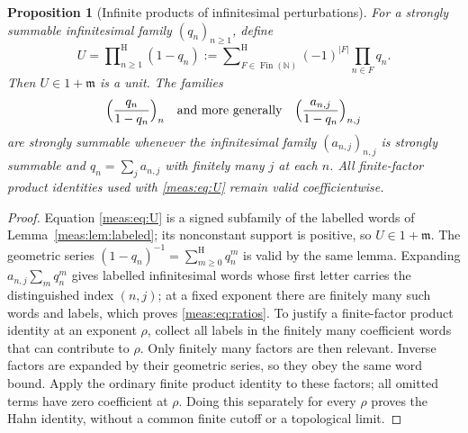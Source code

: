 \documentclass[11pt]{article}
\numberwithin{equation}{section}
\newtheorem{proposition}[theorem]{Proposition}
\theoremstyle{definition}
\theoremstyle{remark}
\newcommand{\N}{\mathbb N}
\newcommand{\Fin}{\operatorname{Fin}}
\newcommand{\hsum}{\mathop{\sum}\nolimits^{\mathrm H}}
\newcommand{\hprod}{\mathop{\prod}\nolimits^{\mathrm H}}
\newcommand{\abs}[1]{\lvert#1\rvert}
\begin{document}
\begin{proposition}[Infinite products of infinitesimal perturbations]
\label{meas:prop:products}
For a strongly summable infinitesimal family $(q_n)_{n\ge1}$, define
\begin{equation}\label{meas:eq:U}
 U=\hprod_{n\ge1}(1-q_n)
   :=\hsum_{F\in\Fin(\N)}(-1)^{\abs F}\prod_{n\in F}q_n .
\end{equation}
Then $U\in1+\mathfrak m$ is a unit. The families
\begin{equation}\label{meas:eq:ratios}
 \Bigl(\frac{q_n}{1-q_n}\Bigr)_n\quad\text{and more generally}\quad
 \Bigl(\frac{a_{n,j}}{1-q_n}\Bigr)_{n,j}
\end{equation}
are strongly summable whenever the infinitesimal family $(a_{n,j})_{n,j}$ is
strongly summable and $q_n=\sum_ja_{n,j}$ with finitely many $j$ at each $n$.
All finite-factor product identities used with \eqref{meas:eq:U} remain valid
coefficientwise.
\end{proposition}
\begin{proof}
Equation \eqref{meas:eq:U} is a signed subfamily of the labelled words of
Lemma~\ref{meas:lem:labeled}; its nonconstant support is positive, so
$U\in1+\mathfrak m$. The geometric series $(1-q_n)^{-1}=\hsum_{m\ge0}q_n^m$ is
valid by the same lemma. Expanding $a_{n,j}\sum_mq_n^m$ gives labelled
infinitesimal words whose first letter carries the distinguished index
$(n,j)$; at a fixed exponent there are finitely many such words and labels,
which proves \eqref{meas:eq:ratios}. To justify a finite-factor product
identity at an exponent $\rho$, collect
all labels in the finitely many coefficient words that can contribute to
$\rho$. Only finitely many factors are then relevant. Inverse factors are
expanded by their geometric series, so they obey the same word bound.
Apply the ordinary finite product identity to these factors; all omitted
terms have zero coefficient at $\rho$. Doing this separately for every
$\rho$ proves the Hahn identity, without a common finite cutoff or a
topological limit.
\end{proof}
\end{document}
